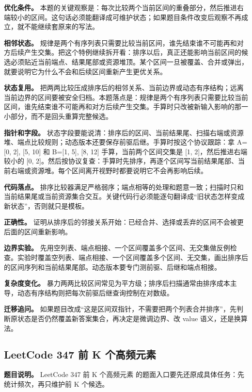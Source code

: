 \textbf{优化条件。} 本题的关键观察是：每次比较两个当前区间的重叠部分，然后推进右端较小的区间。这句话必须能翻译成可维护状态；如果题目条件改变后观察不再成立，就不能继续套原来的写法。

\textbf{相邻状态。} 规律是两个有序列表只需要比较当前区间，谁先结束谁不可能再和对方后续产生交集。把这个特例继续拆开看：排序以后，真正还能影响当前区间的候选必须贴近当前端点、结果尾部或资源堆顶。某个区间一旦被覆盖、合并或弹出，就要说明它为什么不会和后续区间重新产生更优关系。

\textbf{状态复用。} 把两两比较压成排序后的相邻关系、当前边界或动态有序结构；远离当前边界的区间要被安全归档。本题落点是：规律是两个有序列表只需要比较当前区间，谁先结束谁不可能再和对方后续产生交集。手算时只改被新输入影响的那一小部分，而不是回头重算完整候选。

\textbf{指针和字段。} 状态字段要能说清：排序后的区间、当前结果尾、扫描右端或资源堆、端点比较规则；动态版本还要保存前驱后继。手算时按这个协议跟踪：拿 A=[0, 2], [5, 10] 和 B=[1, 5], [8, 12] 手算，当前两个区间交集是 [1, 2]，然后推进右端较小的 [0, 2]。然后按协议复查：手算时先排序，再逐个区间写当前结果尾部、当前右端或资源堆。每个区间离开视野时都要说明它不会再影响后续。

\textbf{代码落点。} 排序比较器满足严格弱序；端点相等的处理和题意一致；扫描时只和当前结果尾或当前资源集合交互。关键代码行必须能逐句翻译成“旧状态怎样变成新状态”，否则就只是模板。

\textbf{正确性。} 证明从排序后的邻接关系开始：已经合并、选择或丢弃的区间不会被更后面的区间重新影响。

\textbf{边界实验。} 先用空列表、端点相接、一个区间覆盖多个区间、无交集做反例检查。实验时覆盖空列表、端点相接、一个区间覆盖多个区间、无交集，画出排序后的区间序列和当前结果尾部。动态版本要专门测前驱、后继和端点相接。

\textbf{复杂度变化。} 暴力两两比较区间常见为平方级；排序后扫描通常由排序成本主导，动态有序结构则把每次前驱后继查询控制在对数级。

\textbf{迁移追问。} 如果题目改成“这是区间双指针，不需要把两个列表合并排序”，先判断原状态是否仍然覆盖新答案集合，再决定是微调边界、改 value 语义，还是换算法。

\subsection{LeetCode 347 前 K 个高频元素}

\textbf{题目说明。} LeetCode 347 前 K 个高频元素 的题面入口要先还原成具体任务：先统计频次，再只维护前 K 个候选。

